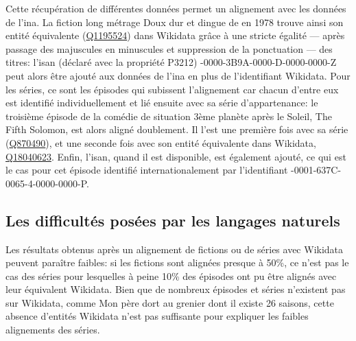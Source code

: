 Cette récupération de différentes données permet un alignement avec les données de l'\ac{ina}. La fiction long métrage \og Doux dur et dingue\fg{} de  en 1978 trouve ainsi son entité équivalente (\href{https://www.wikidata.org/wiki/Q1195524}{Q1195524}) dans Wikidata grâce à une stricte égalité --- après passage des majuscules en minuscules et suppression de la ponctuation --- des titres: l'\ac{isan} (déclaré avec la propriété P3212) -0000-3B9A-0000-D-0000-0000-Z\fg{} peut alors être ajouté aux données de l'\ac{ina} en plus de l'identifiant Wikidata.
Pour les séries, ce sont les épisodes qui subissent l'alignement car chacun d'entre eux est identifié individuellement et lié ensuite avec sa série d'appartenance: le troisième épisode de la comédie de situation \og 3ème planète après le Soleil\fg{}, \og The Fifth Solomon\fg{}, est alors aligné doublement. Il l'est une première fois avec sa série (\href{https://www.wikidata.org/wiki/Q870490}{Q870490}), et une seconde fois avec son entité équivalente dans Wikidata, \href{https://www.wikidata.org/wiki/Q18040623}{Q18040623}. Enfin, l'\ac{isan}, quand il est disponible, est également ajouté, ce qui est le cas pour cet épisode identifié internationalement par l'identifiant -0001-637C-0065-4-0000-0000-P\fg{}.

\subsection{\label{III-A-3-c}Les difficultés posées par les langages naturels}

Les résultats obtenus après un alignement de fictions ou de séries avec Wikidata peuvent paraître faibles: si les fictions sont alignées presque à 50\%, ce n'est pas le cas des séries pour lesquelles à peine 10\% des épisodes ont pu être alignés avec leur équivalent Wikidata. Bien que de nombreux épisodes et séries n'existent pas sur Wikidata, comme \og Mon père dort au grenier\fg{} dont il existe 26 saisons, cette absence d'entités Wikidata n'est pas suffisante pour expliquer les faibles alignements des séries.\\

